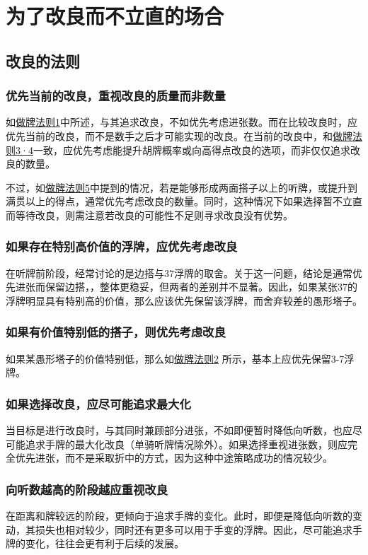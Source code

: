 \chapter{为了改良而不立直的场合}
\section{改良的法则}
\subsection{优先当前的改良，重视改良的质量而非数量}\label{lec3:改良法则1}
如\hyperref[lec1:做牌法则1]{做牌法则1}中所述，与其追求改良，不如优先考虑进张数。而在比较改良时，应优先当前的改良，而不是数手之后才可能实现的改良。在当前的改良中，和\hyperref[lec1:做牌法则3]{做牌法则3·4}一致，应优先考虑能提升胡牌概率或向高得点改良的选项，而非仅仅追求改良的数量。

不过，如\hyperref[lec1:做牌法则5]{做牌法则5}中提到的情况，若是能够形成两面搭子以上的听牌，或提升到满贯以上的得点，通常优先考虑改良的数量。同时，这种情况下如果选择暂不立直而等待改良，则需注意若改良的可能性不足则寻求改良没有优势。

\subsection{如果存在特别高价值的浮牌，应优先考虑改良}\label{lec3:改良法则2}
在听牌前阶段，经常讨论的是边搭与37浮牌的取舍。关于这一问题，结论是通常优先进张而保留边搭，，整体更稳妥，但两者的差别并不显著。因此，如果某张37的浮牌明显具有特别高的价值，那么应该优先保留该浮牌，而舍弃较差的愚形塔子。

\subsection{如果有价值特别低的搭子，则优先考虑改良}
如果某愚形塔子的价值特别低，那么如\hyperref[lec1:做牌法则2]{做牌法则2} 所示，基本上应优先保留3-7浮牌。

\subsection{如果选择改良，应尽可能追求最大化}\label{lec3:改良法则4}
当目标是进行改良时，与其同时兼顾部分进张，不如即便暂时降低向听数，也应尽可能追求手牌的最大化改良（单骑听牌情况除外）。如果选择重视进张数，则应完全优先进张，而不是采取折中的方式，因为这种中途策略成功的情况较少。

\subsection{向听数越高的阶段越应重视改良}
在距离和牌较远的阶段，更倾向于追求手牌的变化。此时，即便是降低向听数的变动，其损失也相对较少，同时还有更多可以用于手变的浮牌。因此，尽可能追求手牌的变化，往往会更有利于后续的发展。

